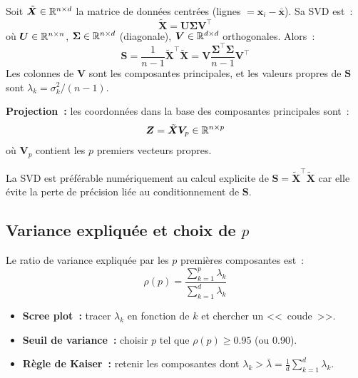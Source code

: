 \begin{formules}[title=\textbf{PCA via la d\'ecomposition en valeurs singuli\`eres}]
Soit $\tilde{\bm{X}} \in \mathbb{R}^{n \times d}$ la matrice de donn\'ees centr\'ees
(lignes $= \bm{x}_i - \bar{\bm{x}}$). Sa SVD est~:
\begin{equation}
  \tilde{\bm{X}} = \bm{U} \bm{\Sigma} \bm{V}^\top
\end{equation}
o\`u $\bm{U} \in \mathbb{R}^{n \times n}$, $\bm{\Sigma} \in \mathbb{R}^{n \times d}$
(diagonale), $\bm{V} \in \mathbb{R}^{d \times d}$ orthogonales. Alors~:
\begin{equation}
  \bm{S} = \frac{1}{n-1}\tilde{\bm{X}}^\top \tilde{\bm{X}} = \bm{V}
  \frac{\bm{\Sigma}^\top \bm{\Sigma}}{n-1} \bm{V}^\top
\end{equation}
Les colonnes de $\bm{V}$ sont les composantes principales, et les valeurs
propres de $\bm{S}$ sont $\lambda_k = \sigma_k^2 / (n-1)$.

\textbf{Projection~:} les coordonn\'ees dans la base des composantes
principales sont~:
\begin{equation}
  \bm{Z} = \tilde{\bm{X}} \bm{V}_p \in \mathbb{R}^{n \times p}
\end{equation}
o\`u $\bm{V}_p$ contient les $p$ premiers vecteurs propres.
\end{formules}

\begin{remarque}
La SVD est pr\'ef\'erable num\'eriquement au calcul explicite de
$\bm{S} = \tilde{\bm{X}}^\top \tilde{\bm{X}}$ car elle \'evite la perte de
pr\'ecision li\'ee au conditionnement de $\bm{S}$.
\end{remarque}

\subsection{Variance expliqu\'ee et choix de $p$}

\begin{definition}
Le ratio de variance expliqu\'ee par les $p$ premi\`eres composantes est~:
\begin{equation}
  \rho(p) = \frac{\sum_{k=1}^p \lambda_k}{\sum_{k=1}^d \lambda_k}
  \label{eq:var-explained}
\end{equation}
\end{definition}

\begin{bonnepratique}[title=\textbf{Choix du nombre de composantes}]
\begin{itemize}
  \item \textbf{Scree plot~:} tracer $\lambda_k$ en fonction de $k$ et chercher
    un <<~coude~>>.
  \item \textbf{Seuil de variance~:} choisir $p$ tel que $\rho(p) \geq 0.95$
    (ou 0.90).
  \item \textbf{R\`egle de Kaiser~:} retenir les composantes dont
    $\lambda_k > \bar{\lambda} = \frac{1}{d}\sum_{k=1}^d \lambda_k$.
\end{itemize}
\end{bonnepratique}


